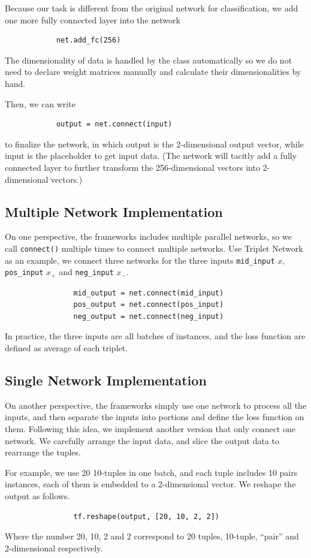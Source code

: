 \documentclass[10pt,twocolumn,letterpaper]{article}
\begin{document}
		Because our task is different from the original network for classification, we add one more fully connected layer into the network
		\begin{verbatim}
			net.add_fc(256)
		\end{verbatim}
		
		The dimensionality of data is handled by the class automatically so we do not need to  declare weight matrices manually and calculate their dimensionalities by hand.
		
		Then, we can write
		\begin{verbatim}
			output = net.connect(input)
		\end{verbatim}
		to finalize the network, in which output is the 2-dimensional output vector, while input is the placeholder to get input data. (The network will tacitly add a fully connected layer to further transform the 256-dimensional vectors into 2-dimensional vectors.)
		
		\subsection{Multiple Network Implementation}
			On one perspective, the frameworks includes multiple parallel networks, so we call \verb|connect()| multiple times to connect multiple networks. Use Triplet Network as an example, we connect three networks for the three inputs \verb|mid_input| $x$, \verb|pos_input| $x_+$ and \verb|neg_input| $x_-$.
			\begin{verbatim}
				mid_output = net.connect(mid_input)
				pos_output = net.connect(pos_input)
				neg_output = net.connect(neg_input)
			\end{verbatim}
			In practice, the three inputs are all batches of instances, and the loss function are defined as average of each triplet.
			
		\subsection{Single Network Implementation}
			On another perspective, the frameworks simply use one network to process all the inputs, and then separate the inputs into portions and define the loss function on them. Following this idea, we implement another version that only connect one network. We carefully arrange the input data, and slice the output data to rearrange the tuples.
			
			For example, we use 20 10-tuples in one batch, and each tuple includes 10 pairs instances, each of them is embedded to a 2-dimensional vector. We reshape the output as follows.
			\begin{verbatim}
				tf.reshape(output, [20, 10, 2, 2])
			\end{verbatim}
			Where the number 20, 10, 2 and 2 correspond to 20 tuples, 10-tuple, ``pair'' and 2-dimensional respectively.
\end{document}
